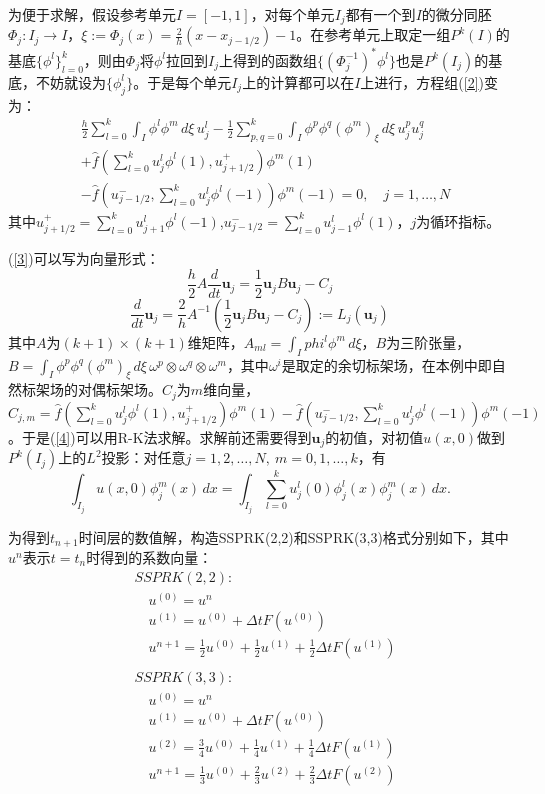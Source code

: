 \documentclass[12pt, a4paper]{ctexart}
\begin{document}
	为便于求解，假设参考单元$I = [-1,1]$，对每个单元$I_j$都有一个到$I$的微分同胚$\Phi_j : I_j \to I$，$ \xi := \Phi_j(x) = \frac{2}{h} (x - x_{j-1/2}) - 1$。在参考单元上取定一组$P^k(I)$的基底$\{\phi^l\}_{l=0}^k$，则由$\Phi_j$将$\phi^l$拉回到$I_j$上得到的函数组$\{(\Phi_j^{-1})^* \phi^l\}$也是$P^k(I_j)$的基底，不妨就设为$\{\phi_j^l\}$。于是每个单元$I_j$上的计算都可以在$I$上进行，方程组(\ref{2})变为：
	\begin{equation}
	\begin{split}
	&  \frac{h}{2} \sum_{l=0}^k \int_I \phi^l \phi^m \, d\xi \, u_j^l -\frac{1}{2} \sum_{p,q=0}^k \int_I \phi^p \phi^q (\phi^m)_\xi \, d\xi \, u_j^p u_j^q \\
	& + \hat{f}(\sum_{l=0}^k u_j^l \phi^l(1),u_{j+1/2}^+) \phi^m(1)\\
	& - \hat{f}(u_{j-1/2}^-, \sum_{l=0}^k u_j^l \phi^l(-1)) \phi^m(-1) = 0, \quad j = 1, \dots,N
	\end{split}
	\label{3}
	\end{equation}
	其中$u_{j+1/2}^+ = \sum_{l=0}^k u_{j+1}^l \phi^l(-1)$,$u_{j-1/2}^- = \sum_{l=0}^k u_{j-1}^l \phi^l(1)$，$j$为循环指标。
	
	(\ref{3})可以写为向量形式：
	$$
	\frac{h}{2} A \frac{d}{dt} \textbf{u}_j = \frac{1}{2} \textbf{u}_j B \textbf{u}_j - C_j
	$$
	\begin{equation}
	\frac{d}{dt} \textbf{u}_j = \frac{2}{h} A^{-1} (\frac{1}{2} \textbf{u}_j B \textbf{u}_j - C_j) := L_j(\textbf{u}_j)
	\label{4}
	\end{equation}
	其中$A$为$(k+1) \times (k+1)$维矩阵，$A_{ml} = \int_I phi^l \phi^m \, d\xi$，$B$为三阶张量，$B = \int_I \phi^p \phi^q (\phi^m)_\xi \, d\xi \, \omega^p \otimes \omega^q \otimes \omega^m$，其中$\omega^i$是取定的余切标架场，在本例中即自然标架场的对偶标架场。$C_j$为$m$维向量，$C_{j,m} = \hat{f}(\sum_{l=0}^k u_j^l \phi^l(1),u_{j+1/2}^+) \phi^m(1)- \hat{f}(u_{j-1/2}^-, \sum_{l=0}^k u_j^l \phi^l(-1)) \phi^m(-1)$。于是(\ref{4})可以用R-K法求解。求解前还需要得到$\textbf{u}_j$的初值，对初值$u(x,0)$做到$P^k(I_j)$上的$L^2$投影：对任意$j=1,2,\dots,N, \  m = 0,1,\dots,k$，有
	$$
	\int_{I_j} u(x,0) \phi_j^m(x) \, dx  = \int_{I_j} \sum_{l=0}^k u_j^l(0) \phi_j^l(x) \phi_j^m(x) \, dx.
	$$
	
	为得到$t_{n+1}$时间层的数值解，构造SSPRK(2,2)和SSPRK(3,3)格式分别如下，其中$u^n$表示$t =t_n$时得到的系数向量：
	\begin{align*}
	&SSPRK(2,2):\\
	& \quad u^{(0)} = u^n\\
	& \quad u^{(1)} = u^{(0)} + \Delta t F(u^{(0)})\\
	& \quad u^{n+1} = \frac{1}{2} u^{(0)} + \frac{1}{2} u^{(1)} + \frac{1}{2} \Delta t F(u^{(1)})\\
	&\\
	&SSPRK(3,3):\\
	& \quad u^{(0)} = u^n\\
	& \quad u^{(1)} = u^{(0)} + \Delta t F(u^{(0)})\\
	& \quad u^{(2)} = \frac{3}{4} u^{(0)} + \frac{1}{4} u^{(1)} + \frac{1}{4} \Delta t F(u^{(1)}) \\
	& \quad u^{n+1} = \frac{1}{3} u^{(0)} + \frac{2}{3} u^{(2)} + \frac{2}{3} \Delta t F(u^{(2)})
	\end{align*}
	
\end{document}
